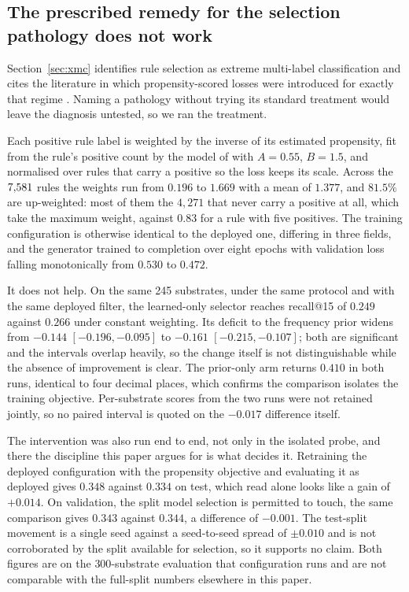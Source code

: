 \subsection{The prescribed remedy for the selection pathology does not work}

Section~\ref{sec:xmc} identifies rule selection as extreme multi-label classification and cites the
literature in which propensity-scored losses were introduced for exactly that regime
\citep{Jain_2016}. Naming a pathology without trying its standard treatment would leave the
diagnosis untested, so we ran the treatment.

Each positive rule label is weighted by the inverse of its estimated propensity, fit from the rule's
positive count by the model of \citet{Jain_2016} with $A=0.55$, $B=1.5$, and normalised over rules
that carry a positive so the loss keeps its scale. Across the $7{,}581$ rules the weights run from
$0.196$ to $1.669$ with a mean of $1.377$, and $81.5\%$ are up-weighted: most of them
the $4{,}271$ that never carry a positive at all, which take the maximum weight, against $0.83$
for a rule with five positives. The training
configuration is otherwise identical to the deployed one, differing in three fields, and the
generator trained to completion over eight epochs with validation loss falling monotonically from
$0.530$ to $0.472$.

It does not help. On the same 245 substrates, under the same protocol and with the same deployed
filter, the learned-only selector reaches recall@15 of $0.249$ against $0.266$ under constant
weighting. Its deficit to the frequency prior widens from $-0.144$ $[-0.196,-0.095]$ to $-0.161$
$[-0.215,-0.107]$; both are significant and the intervals overlap heavily, so the change itself is
not distinguishable while the absence of improvement is clear. The prior-only arm returns $0.410$
in both runs, identical to four decimal places, which confirms the comparison isolates the training
objective. Per-substrate scores from the two runs were not retained jointly, so no paired interval is quoted on the $-0.017$ difference itself.

The intervention was also run end to end, not only in the isolated probe, and there the discipline
this paper argues for is what decides it. Retraining the deployed configuration with the propensity
objective and evaluating it as deployed gives $0.348$ against $0.334$ on test, which read alone
looks like a gain of $+0.014$. On validation, the split model selection is permitted to touch, the
same comparison gives $0.343$ against $0.344$, a difference of $-0.001$. The test-split movement is
a single seed against a seed-to-seed spread of $\pm0.010$ and is not corroborated by the split available for
selection, so it supports no claim. Both figures are on the $300$-substrate evaluation
that configuration runs and are not comparable with the full-split numbers elsewhere in this paper.

